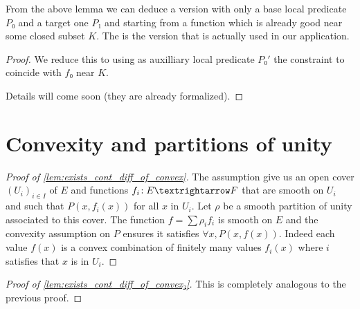 From the above lemma we can deduce a version with only a base local predicate $P₀$ and
a target one $P₁$ and starting from a function which is already good near some closed
subset $K$. The is the version that is actually used in our application.


\begin{proof}\leanok
  We reduce this to  using as auxilliary
  local predicate $P₀'$ the constraint to coincide with $f₀$ near $K$.

  Details will come soon (they are already formalized).
\end{proof}

\section{Convexity and partitions of unity}%
\label{sec:Convexity and partitions of unity}


\begin{proof}[Proof of \ref{lem:exists_cont_diff_of_convex}]
  \leanok
  The assumption give us an open cover $(U_i)_{i ∈ I}$ of $E$ and functions
  $f_i \co E → F$ that are smooth on $U_i$ and such that $P(x, f_i(x))$ for all $x$ in $U_i$.
  Let $ρ$ be a smooth partition of unity associated to this cover. The function
  $f = ∑ ρ_i f_i$ is smooth on $E$ and the convexity assumption on $P$ ensures
  it satisfies $\forall x, P(x, f(x))$. Indeed each value $f(x)$ is a convex combination
  of finitely many values $f_i(x)$ where $i$ satisfies that $x$ is in $U_i$.
\end{proof}
\begin{proof}[Proof of \ref{lem:exists_cont_diff_of_convex₂}]
  \leanok
  This is completely analogous to the previous proof.
\end{proof}
